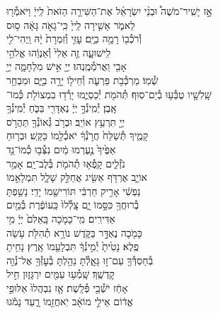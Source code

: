 \documentclass[twoside, openany, parskip=half, 11pt]{book}
\begin{document}
אָ֣ז \hfill
יָשִֽׁיר־מֹשֶׁה֩ \hfill וּבְנֵ֨י \hfill יִשְׂרָאֵ֜ל \hfill אֶת־הַשִּׁירָ֤ה \hfill הַזֹּאת֙ \hfill לַֽייָ֔ \hfill וַיֹּאמְ֯ר֖וּ \\
לֵאמֹ֑ר \hfill אָשִׁ֤ירָה לַֽייָ֙ כִּֽי־גָאֹ֣ה גָּאָ֔ה \hfill ס֥וּס \\
וְ֯רֹכְ֯ב֖וֹ רָמָ֥ה בַיָּֽם׃ \hfill עׇזִּ֤י וְ֯זִמְרָת֙ יָ֔הּ וַֽיְהִי־לִ֖י \\
לִֽישׁוּעָ֑ה \hfill זֶ֤ה אֵלִי֙ וְ֯אַנְוֵ֔הוּ \hfill אֱלֹהֵ֥י \\
אָבִ֖י וַאֲרֹמְ֯מֶֽנְהוּ׃ \hfill יְיָ֖ אִ֣ישׁ מִלְחָמָ֑ה יְיָ֖ \\
שְׁ֯מֽוֹ׃ \hfill מַרְכְּ֯בֹ֥ת פַּרְעֹ֛ה וְ֯חֵיל֖וֹ יָרָ֣ה בַיָּ֑ם \hfill וּמִבְחַ֥ר\\
שָֽׁלִשָׁ֖יו טֻבְּ֯ע֥וּ בְ֯יַם־סֽוּף׃ \hfill תְּ֯הֹמֹ֖ת יְ֯כַסְיֻ֑מוּ יָרְ֯ד֥וּ בִמְצוֹלֹ֖ת כְּ֯מוֹ־\\
אָֽבֶן׃ \hfill יְ֯מִֽינְ֯ךָ֣ יְיָ֔ נֶאְדָּרִ֖י בַּכֹּ֑חַ \hfill יְ֯מִֽינְ֯ךָ֥ \\
יְיָ֖ תִּרְעַ֥ץ אוֹיֵֽב׃ \hfill וּבְרֹ֥ב גְּ֯אוֹנְ֯ךָ֖ תַּהֲרֹ֣ס \\
קָמֶ֑יךָ \hfill תְּ֯שַׁלַּח֙ חֲרֹ֣נְ֯ךָ֔ יֹאכְ֯לֵ֖מוֹ כַּקַּֽשׁ׃ \hfill וּבְר֤וּחַ \\
אַפֶּ֙יךָ֙ נֶ֣עֶרְמוּ מַ֔יִם \hfill נִצְּ֯ב֥וּ כְ֯מוֹ־נֵ֖ד \\
נֹזְ֯לִ֑ים \hfill קָֽפְ֯א֥וּ תְ֯הֹמֹ֖ת בְּ֯לֶב־יָֽם׃ \hfill אָמַ֥ר \\
אוֹיֵ֛ב אֶרְדֹּ֥ף אַשִּׂ֖יג \hfill אֲחַלֵּ֣ק שָׁלָ֑ל תִּמְלָאֵ֣מוֹ \\
נַפְשִׁ֔י \hfill אָרִ֣יק חַרְבִּ֔י תּוֹרִישֵׁ֖מוֹ יָדִֽי׃ \hfill נָשַׁ֥פְתָּ \\
בְ֯רוּחֲךָ֖ כִּסָּ֣מוֹ יָ֑ם \hfill צָֽלְ֯לוּ֙ כַּֽעוֹפֶ֔רֶת בְּ֯מַ֖יִם \\
אַדִּירִֽים׃ \hfill מִֽי־כָמֹ֤כָה בָּֽאֵלִם֙ יְיָ֔ \hfill מִ֥י \\
כָּמֹ֖כָה נֶאְדָּ֣ר בַּקֹּ֑דֶשׁ \hfill נוֹרָ֥א תְ֯הִלֹּ֖ת עֹ֥שֵׂה \\
פֶֽלֶא׃ \hfill נָטִ֙יתָ֙ יְ֯מִ֣ינְ֯ךָ֔ תִּבְלָעֵ֖מוֹ אָֽרֶץ׃ \hfill נָחִ֥יתָ \\
בְ֯חַסְדְּ֯ךָ֖ עַם־ז֣וּ גָּאָ֑לְ֯תָּ \hfill נֵהַ֥לְתָּ בְ֯עׇזְּ֯ךָ֖ אֶל־נְ֯וֵ֥ה \\
קׇדְשֶֽׁךָ׃ \hfill שָֽׁמְ֯ע֥וּ עַמִּ֖ים יִרְגָּז֑וּן \hfill חִ֣יל \\
אָחַ֔ז יֹשְׁ֯בֵ֖י פְּ֯לָֽשֶׁת׃ \hfill אָ֤ז נִבְהֲלוּ֙ אַלּוּפֵ֣י \\
אֱד֔וֹם \hfill אֵילֵ֣י מוֹאָ֔ב יֹֽאחֲזֵ֖מוֹ רָ֑עַד \hfill נָמֹ֕גוּ \\
\end{document}
